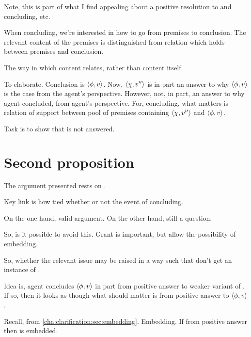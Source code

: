 \begin{note}[Aside]
  Note, this is part of what I find appealing about a positive resolution to \issueConstraint{} and concluding, etc.

  When concluding, we're interested in how to go from premises to conclusion.
  The relevant content of the premises is distinguished from relation which holds between premises and conclusion.

  The way in which content relates, rather than content itself.

  To elaborate.
  Conclusion is \(\langle \phi, v \rangle\).
  Now, \(\langle \chi, v'' \rangle\) is in part an answer to why \(\langle \phi, v \rangle\) is the case from the agent's perspective.
  However, not, in part, an answer to why agent concluded, from agent's perspective.
  For, concluding, what matters is relation of support between pool of premises containing \(\langle \chi, v'' \rangle\) and \(\langle \phi, v \rangle\).
\end{note}

\begin{note}
  Task is to show that \qzS{} is not answered.
\end{note}

\section{Second proposition}
\label{sec:flexible-argument}

\begin{note}
  The argument presented rests on \qzS{}.

  Key link is how \qzS{} tied whether or not \fc{} the event of concluding.

  On the one hand, valid argument.
  On the other hand, still a question.

  So, is it possible to avoid this.
  Grant \fc{} is important, but allow the possibility of embedding.

  So, whether the relevant issue may be raised in a way such that don't get an instance of \qzS{}.

  Idea is, agent concludes \(\langle \phi, v \rangle\) in part from positive answer to weaker variant of \qzS{}.
  If so, then it looks as though what should matter is \support{} from positive answer to \(\langle \phi, v \rangle\).

  Recall, from \autoref{cha:clarification:sec:embedding}.
  Embedding.
  If \support{} from positive answer then \support{} is embedded.
\end{note}

